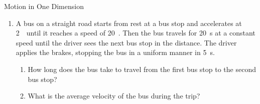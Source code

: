 \begin{eocexercises}{Motion in One Dimension}
\begin{enumerate}[noitemsep, label=\textbf{\arabic*}. ]
\item{A bus on a straight road starts from rest at a bus stop and accelerates at 2~\mss\ until it reaches a speed of 20~\ms. Then the bus travels for 20~s at a constant speed until the driver sees the next bus stop in the distance. The driver applies the brakes, stopping the bus in a uniform manner in 5~s.
\begin{enumerate}
\item How long does the bus take to travel from the first bus stop to the second bus stop?
\item What is the average velocity of the bus during the trip?
\end{enumerate}}
\end{enumerate}
\end{eocexercises}